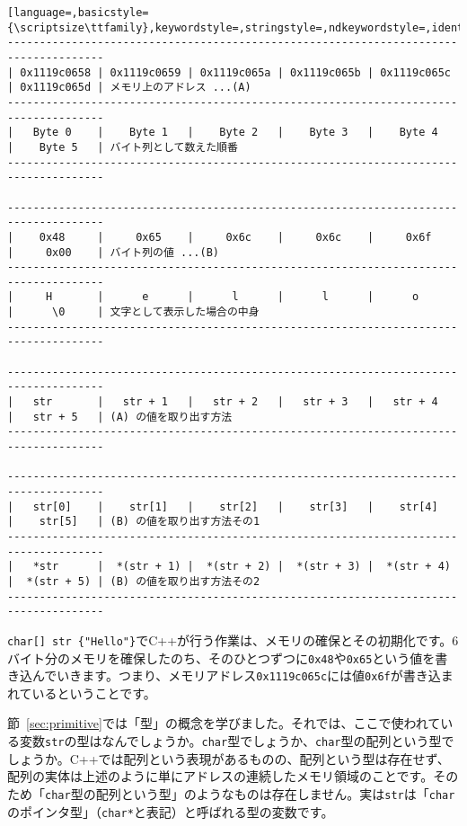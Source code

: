 \begin{lstlisting}[language=,basicstyle={\scriptsize\ttfamily},keywordstyle=,stringstyle=,ndkeywordstyle=,identifierstyle=]
-------------------------------------------------------------------------------------
| 0x1119c0658 | 0x1119c0659 | 0x1119c065a | 0x1119c065b | 0x1119c065c | 0x1119c065d | メモリ上のアドレス ...(A)
-------------------------------------------------------------------------------------
|   Byte 0    |    Byte 1   |    Byte 2   |    Byte 3   |    Byte 4   |    Byte 5   | バイト列として数えた順番
-------------------------------------------------------------------------------------

-------------------------------------------------------------------------------------
|    0x48     |     0x65    |     0x6c    |     0x6c    |     0x6f    |     0x00    | バイト列の値 ...(B)
-------------------------------------------------------------------------------------
|     H       |      e      |      l      |      l      |      o      |      \0     | 文字として表示した場合の中身
-------------------------------------------------------------------------------------

-------------------------------------------------------------------------------------
|   str       |   str + 1   |   str + 2   |   str + 3   |   str + 4   |   str + 5   | (A) の値を取り出す方法
-------------------------------------------------------------------------------------

-------------------------------------------------------------------------------------
|   str[0]    |    str[1]   |    str[2]   |    str[3]   |    str[4]   |    str[5]   | (B) の値を取り出す方法その1
-------------------------------------------------------------------------------------
|   *str      |  *(str + 1) |  *(str + 2) |  *(str + 3) |  *(str + 4) |  *(str + 5) | (B) の値を取り出す方法その2
-------------------------------------------------------------------------------------
\end{lstlisting}

\texttt{char[] str \{"Hello"\}}でC++が行う作業は、メモリの確保とその初期化です。6バイト分のメモリを確保したのち、そのひとつずつに\texttt{0x48}や\texttt{0x65}という値を書き込んでいきます。つまり、メモリアドレス\texttt{0x1119c065c}には値\texttt{0x6f}が書き込まれているということです。

節~\ref{sec:primitive}では「型」の概念を学びました。それでは、ここで使われている変数\texttt{str}の型はなんでしょうか。\texttt{char}型でしょうか、\texttt{char}型の配列という型でしょうか。C++では配列という表現があるものの、配列という型は存在せず、配列の実体は上述のように単にアドレスの連続したメモリ領域のことです。そのため「\texttt{char}型の配列という型」のようなものは存在しません。実は\texttt{str}は「\texttt{char}のポインタ型」（\texttt{char*}と表記）と呼ばれる型の変数です。

